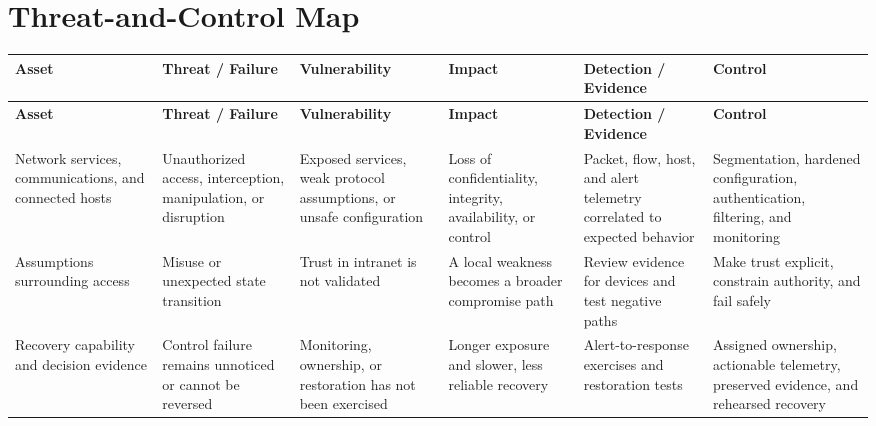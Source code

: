 \documentclass[11pt,letterpaper]{article}
\begin{document}
\section*{Threat-and-Control Map}
\begingroup\scriptsize\setlength{\tabcolsep}{2pt}
\begin{longtable}{>{\raggedright\arraybackslash}p{}>{\raggedright\arraybackslash}p{}>{\raggedright\arraybackslash}p{}>{\raggedright\arraybackslash}p{}>{\raggedright\arraybackslash}p{}>{\raggedright\arraybackslash}p{}}
\toprule\rowcolor{Navy}\color{white}\textbf{Asset} & \color{white}\textbf{Threat / Failure} & \color{white}\textbf{Vulnerability} & \color{white}\textbf{Impact} & \color{white}\textbf{Detection / Evidence} & \color{white}\textbf{Control}\\\midrule
\endfirsthead
\toprule\rowcolor{Navy}\color{white}\textbf{Asset} & \color{white}\textbf{Threat / Failure} & \color{white}\textbf{Vulnerability} & \color{white}\textbf{Impact} & \color{white}\textbf{Detection / Evidence} & \color{white}\textbf{Control}\\\midrule
\endhead
Network services, communications, and connected hosts & Unauthorized access, interception, manipulation, or disruption & Exposed services, weak protocol assumptions, or unsafe configuration & Loss of confidentiality, integrity, availability, or control & Packet, flow, host, and alert telemetry correlated to expected behavior & Segmentation, hardened configuration, authentication, filtering, and monitoring\\\midrule
Assumptions surrounding access & Misuse or unexpected state transition & Trust in intranet is not validated & A local weakness becomes a broader compromise path & Review evidence for devices and test negative paths & Make trust explicit, constrain authority, and fail safely\\\midrule
Recovery capability and decision evidence & Control failure remains unnoticed or cannot be reversed & Monitoring, ownership, or restoration has not been exercised & Longer exposure and slower, less reliable recovery & Alert-to-response exercises and restoration tests & Assigned ownership, actionable telemetry, preserved evidence, and rehearsed recovery\\\midrule
\bottomrule
\end{longtable}
\endgroup
\end{document}
